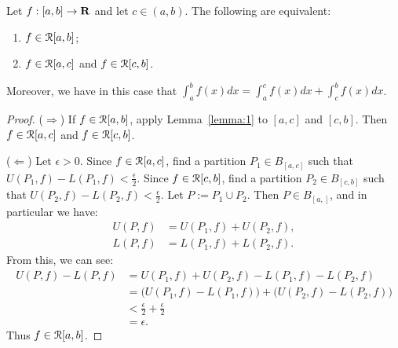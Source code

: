 \documentclass[11pt,twoside,openany]{memoir}
\begin{document}
    \begin{theorem}
        Let $f:[a,b] \rightarrow \mathbf{R}$ and let $c \in (a,b)$. The following are equivalent:
            \begin{enumerate}[label = (\arabic*),itemsep=1pt,topsep=3pt]
                \item $f \in \mathcal{R}[a,b]$;
                \item $f \in \mathcal{R}[a,c]$ and $f \in \mathcal{R}[c,b]$.
            \end{enumerate}
        Moreover, we have in this case that $\int_a^b f(x)dx = \int_a^c f(x)dx + \int_c^b f(x)dx$.
    \end{theorem}
        \begin{proof}
            ($\Rightarrow$) If $f \in \mathcal{R}[a,b]$, apply Lemma~\ref{lemma:1} to $[a,c]$ and $[c,b]$. Then $f \in \mathcal{R}[a,c]$ and $f \in \mathcal{R}[c,b]$.

            ($\Leftarrow$) Let $\epsilon > 0$. Since $f \in \mathcal{R}[a,c]$, find a partition $P_1 \in B_{[a,c]}$ such that $U(P_1,f) - L(P_1,f) < \frac{\epsilon}{2}$. Since $f \in \mathcal{R}[c,b]$, find a partition $P_2 \in B_{[c,b]}$ such that $U(P_2,f) - L(P_2,f) < \frac{\epsilon}{2}$. Let $P := P_1 \cup P_2$. Then $P \in B_{[a,]}$, and in particular we have:
                \begin{equation*}
                \begin{split}
                    U(P,f) &= U(P_1,f) + U(P_2,f), \\
                    L(P,f) &= L(P_1,f) + L(P_2,f).
                \end{split}
                \end{equation*}
            From this, we can see:
                \begin{equation*}
                \begin{split}
                    U(P,f) - L(P,f)
                    & = U(P_1,f) + U(P_2,f) -L(P_1,f) - L(P_2,f) \\
                    & = \bigl(U(P_1,f) -L(P_1,f) \bigr) + \bigl(U(P_2,f) -L(P_2,f) \bigr) \\
                    & < \frac{\epsilon}{2}  + \frac{\epsilon}{2} \\
                    & = \epsilon.
                \end{split}
                \end{equation*}
            Thus $f \in \mathcal{R}[a,b]$.


\end{proof}
\end{document}
